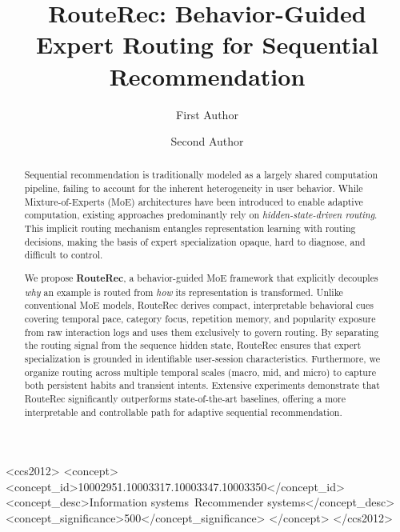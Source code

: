 \documentclass[sigconf,anonymous,review]{acmart-primary/acmart}
\begin{document}
\title[RouteRec for Sequential Recommendation]{RouteRec: Behavior-Guided Expert Routing for Sequential Recommendation}

\author{First Author}

\author{Second Author}

\renewcommand{\shortauthors}{Author et al.}

\begin{abstract}
Sequential recommendation is traditionally modeled as a largely shared computation pipeline, failing to account for the inherent heterogeneity in user behavior. While Mixture-of-Experts (MoE) architectures have been introduced to enable adaptive computation, existing approaches predominantly rely on \textit{hidden-state-driven routing}. This implicit routing mechanism entangles representation learning with routing decisions, making the basis of expert specialization opaque, hard to diagnose, and difficult to control.

We propose \textbf{RouteRec}, a behavior-guided MoE framework that explicitly decouples \textit{why} an example is routed from \textit{how} its representation is transformed. Unlike conventional MoE models, RouteRec derives compact, interpretable behavioral cues covering temporal pace, category focus, repetition memory, and popularity exposure from raw interaction logs and uses them exclusively to govern routing. By separating the routing signal from the sequence hidden state, RouteRec ensures that expert specialization is grounded in identifiable user-session characteristics. Furthermore, we organize routing across multiple temporal scales (macro, mid, and micro) to capture both persistent habits and transient intents. Extensive experiments demonstrate that RouteRec significantly outperforms state-of-the-art baselines, offering a more interpretable and controllable path for adaptive sequential recommendation.
\end{abstract}

\begin{CCSXML}
<ccs2012>
 <concept>
  <concept_id>10002951.10003317.10003347.10003350</concept_id>
  <concept_desc>Information systems~Recommender systems</concept_desc>
  <concept_significance>500</concept_significance>
 </concept>
</ccs2012>
\end{CCSXML}
\end{document}
